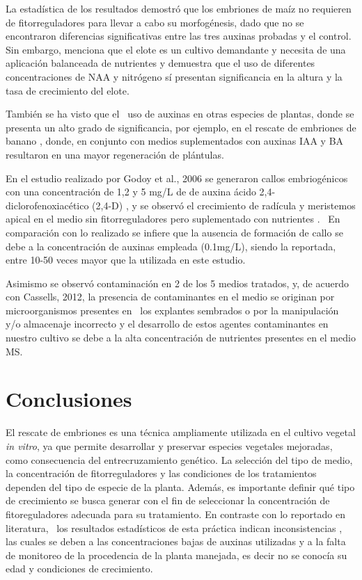 \documentclass{article}
\begin{document}
\begin{multicols}{2}
La estadística de los resultados demostró que los embriones de maíz no requieren de fitorreguladores para llevar a cabo su morfogénesis, dado que no se encontraron diferencias significativas entre las tres auxinas probadas y el control. Sin embargo, \cite{9} menciona que el elote es un cultivo demandante y necesita de una aplicación balanceada de nutrientes y demuestra que el uso de diferentes concentraciones de NAA y nitrógeno sí presentan significancia en la altura y la tasa de crecimiento del elote. \cite{18} 

También se ha visto que el  uso de auxinas en otras especies de plantas, donde se presenta un alto grado de significancia, por ejemplo, en el rescate de embriones de banano \cite{7}, donde, en conjunto con medios suplementados con auxinas IAA y BA resultaron en una mayor regeneración de plántulas. 

En el estudio realizado por Godoy et al., 2006 se generaron callos embriogénicos con una concentración de 1,2 y 5 mg/L de de auxina ácido 2,4- diclorofenoxiacético (2,4-D) , y se observó el crecimiento de radícula y meristemos apical en el medio sin fitorreguladores pero suplementado con nutrientes \cite{20}.  En comparación con lo realizado se infiere que la ausencia de formación de callo se debe a la concentración de auxinas empleada (0.1mg/L), siendo la reportada, entre 10-50 veces mayor que la utilizada en este estudio. \cite{19}

Asimismo se observó contaminación en 2 de los 5 medios tratados, y, de acuerdo con Cassells, 2012, la presencia de contaminantes en el medio se originan por microorganismos presentes en  los explantes sembrados o por la manipulación y/o almacenaje incorrecto y el desarrollo de estos agentes contaminantes en nuestro cultivo se debe a la alta concentración de nutrientes presentes en el medio MS. \cite{1}   

\section{Conclusiones}

El rescate de embriones es una técnica ampliamente utilizada en el cultivo vegetal \textit{in vitro}, ya que permite desarrollar y preservar especies vegetales mejoradas, como consecuencia del entrecruzamiento genético. La selección del tipo de medio, la concentración de fitorreguladores y las condiciones de los tratamientos dependen del tipo de especie de la planta. Además, es importante definir qué tipo de crecimiento se busca generar con el fin de seleccionar la concentración de fitoreguladores adecuada para su tratamiento. En contraste con lo reportado en literatura,  los resultados estadísticos de esta práctica indican inconsistencias \cite{17}, las cuales se deben a las concentraciones bajas de auxinas utilizadas y a la falta de monitoreo de la procedencia de la planta manejada, es decir no se conocía su edad y condiciones de crecimiento. 


\end{multicols}
\end{document}
